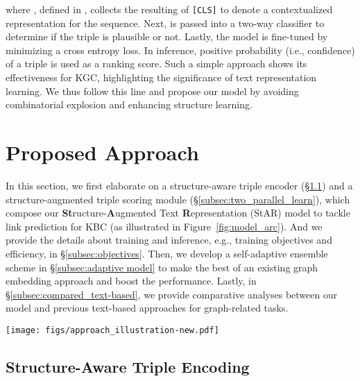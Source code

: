 \documentclass[sigconf]{acmart}
\begin{document}
where , defined in \cite{BERT}, collects the resulting of \texttt{[CLS]} to denote a contextualized representation for the sequence. 
Next,  is passed into a two-way classifier to determine if the triple is plausible or not. Lastly, the model is fine-tuned by minimizing a cross entropy loss. 
In inference, positive probability (i.e., confidence) of a triple is used as a ranking score. 
Such a simple approach shows its effectiveness for KGC, highlighting the significance of text representation learning. 
We thus follow this line and propose our model by avoiding combinatorial explosion and enhancing structure learning. 



\section{Proposed Approach} \label{sec:approach}

In this section, we first elaborate on a structure-aware triple encoder (\S \ref{subsec:triple_enc}) and a structure-augmented triple scoring module (\S \ref{subsec:two_parallel_learn}), which compose our \textbf{St}ructure-\textbf{A}ugmented Text \textbf{R}epresentation (StAR) model to tackle link prediction for KBC (as illustrated in Figure~\ref{fig:model_arc}). 
And we provide the details about training and inference, e.g., training objectives and efficiency, in \S \ref{subsec:objectives}.
Then, we develop a self-adaptive ensemble scheme in \S \ref{subsec:adaptive model} to make the best of an existing graph embedding approach and boost the performance. 
Lastly, in \S \ref{subsec:compared_text-based}, we provide comparative analyses between our model and previous text-based approaches for graph-related tasks. 

\begin{figure*}[t] \centering
	\texttt{[image: figs/approach\_illustration-new.pdf]}
	\caption{\small
	An overview of the proposed \textbf{St}ructure-\textbf{A}ugmented Text \textbf{R}epresentation (StAR) model for link prediction. 
	This illustration is based on a corruption of tail entity, and in the same way for the corruption of a head entity or even relation. Note that a notation whose superscript includes ``'' denotes it is derived from a negative example, otherwise from a positive one.}
	\label{fig:model_arc} 
	\centering
\end{figure*}

\subsection{Structure-Aware Triple Encoding}  \label{subsec:triple_enc} 
\end{document}
